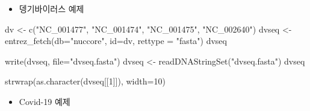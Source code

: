 \documentclass[
]{book}
\newenvironment{Shaded}{\begin{snugshade}}{\end{snugshade}}
\newcommand{\AttributeTok}[1]{\textcolor[rgb]{0.77,0.63,0.00}{#1}}
\newcommand{\DecValTok}[1]{\textcolor[rgb]{0.00,0.00,0.81}{#1}}
\newcommand{\FunctionTok}[1]{\textcolor[rgb]{0.00,0.00,0.00}{#1}}
\newcommand{\NormalTok}[1]{#1}
\newcommand{\OtherTok}[1]{\textcolor[rgb]{0.56,0.35,0.01}{#1}}
\newcommand{\SpecialCharTok}[1]{\textcolor[rgb]{0.00,0.00,0.00}{#1}}
\newcommand{\StringTok}[1]{\textcolor[rgb]{0.31,0.60,0.02}{#1}}
\providecommand{\tightlist}{%
  \setlength{\itemsep}{0pt}\setlength{\parskip}{0pt}}
\begin{document}
\begin{Shaded}
\end{Shaded}

\begin{itemize}
\tightlist
\item
  뎅기바이러스 예제
\end{itemize}

\begin{Shaded}
\begin{Highlighting}[]

\NormalTok{dv }\OtherTok{\textless{}{-}} \FunctionTok{c}\NormalTok{(}\StringTok{"NC\_001477"}\NormalTok{, }\StringTok{"NC\_001474"}\NormalTok{, }\StringTok{"NC\_001475"}\NormalTok{, }\StringTok{"NC\_002640"}\NormalTok{)}
\NormalTok{dvseq }\OtherTok{\textless{}{-}} \FunctionTok{entrez\_fetch}\NormalTok{(}\AttributeTok{db=}\StringTok{"nuccore"}\NormalTok{, }\AttributeTok{id=}\NormalTok{dv, }\AttributeTok{rettype =} \StringTok{"fasta"}\NormalTok{)}
\NormalTok{dvseq}

\FunctionTok{write}\NormalTok{(dvseq, }\AttributeTok{file=}\StringTok{"dvseq.fasta"}\NormalTok{) }
\NormalTok{dvseq }\OtherTok{\textless{}{-}} \FunctionTok{readDNAStringSet}\NormalTok{(}\StringTok{"dvseq.fasta"}\NormalTok{)  }
\NormalTok{dvseq}

\FunctionTok{strwrap}\NormalTok{(}\FunctionTok{as.character}\NormalTok{(dvseq[[}\DecValTok{1}\NormalTok{]]), }\AttributeTok{width=}\DecValTok{10}\NormalTok{)}
\end{Highlighting}
\end{Shaded}

\begin{itemize}
\tightlist
\item
  Covid-19 예제
\end{itemize}
\end{document}
